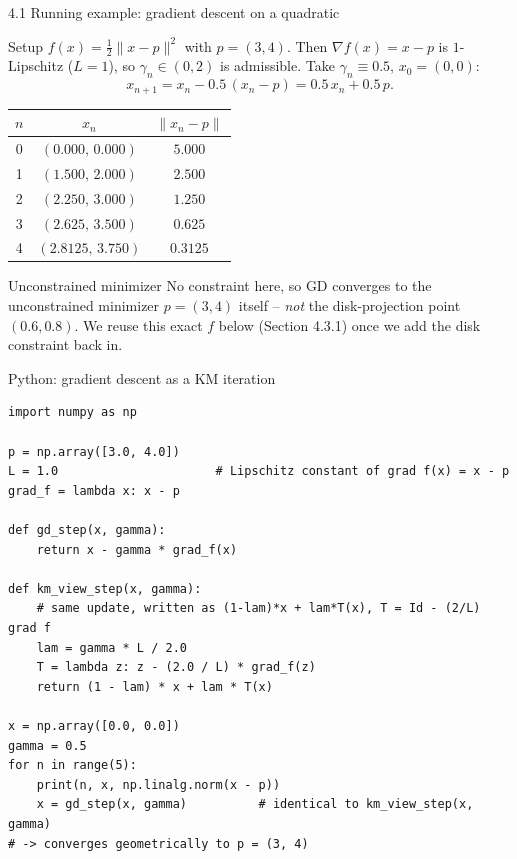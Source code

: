 \documentclass[aspectratio=169,10pt]{beamer}
\begin{document}
\begin{frame}{4.1 Running example: gradient descent on a quadratic}
  \begin{block}{Setup}
    $f(x)=\tfrac12\|x-p\|^2$ with $p=(3,4)$. Then $\nabla f(x)=x-p$ is $1$-Lipschitz ($L=1$), so $\gamma_n\in(0,2)$ is admissible. Take $\gamma_n\equiv 0.5$, $x_0=(0,0)$:
    \[
      x_{n+1} = x_n - 0.5\,(x_n-p) = 0.5\,x_n + 0.5\,p.
    \]
  \end{block}
  \begin{table}
    \centering
    \begin{tabular}{c c c}
      \toprule
      $n$ & $x_n$ & $\|x_n-p\|$ \\
      \midrule
      0 & $(0.000,\,0.000)$ & $5.000$ \\
      1 & $(1.500,\,2.000)$ & $2.500$ \\
      2 & $(2.250,\,3.000)$ & $1.250$ \\
      3 & $(2.625,\,3.500)$ & $0.625$ \\
      4 & $(2.8125,\,3.750)$ & $0.3125$ \\
      \bottomrule
    \end{tabular}
  \end{table}
  \begin{block}{Unconstrained minimizer}
    No constraint here, so GD converges to the unconstrained minimizer $p=(3,4)$ itself -- \emph{not} the disk-projection point $(0.6,0.8)$. We reuse this exact $f$ below (Section 4.3.1) once we add the disk constraint back in.
  \end{block}
\end{frame}

\begin{frame}[fragile]{Python: gradient descent as a KM iteration}
\begin{lstlisting}
import numpy as np

p = np.array([3.0, 4.0])
L = 1.0                      # Lipschitz constant of grad f(x) = x - p
grad_f = lambda x: x - p

def gd_step(x, gamma):
    return x - gamma * grad_f(x)

def km_view_step(x, gamma):
    # same update, written as (1-lam)*x + lam*T(x), T = Id - (2/L) grad f
    lam = gamma * L / 2.0
    T = lambda z: z - (2.0 / L) * grad_f(z)
    return (1 - lam) * x + lam * T(x)

x = np.array([0.0, 0.0])
gamma = 0.5
for n in range(5):
    print(n, x, np.linalg.norm(x - p))
    x = gd_step(x, gamma)          # identical to km_view_step(x, gamma)
# -> converges geometrically to p = (3, 4)
\end{lstlisting}
\end{frame}
\end{document}
